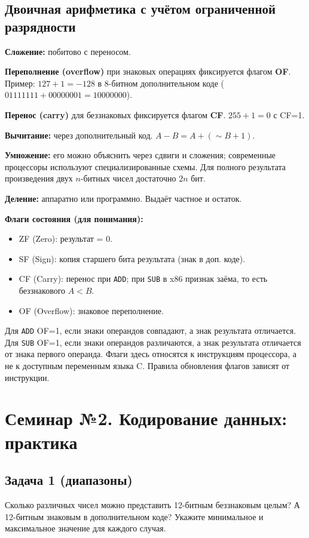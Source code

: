 \subsection{Двоичная арифметика с учётом ограниченной разрядности}

\textbf{Сложение:} побитово с переносом.

\textbf{Переполнение (overflow)} при знаковых операциях фиксируется флагом \textbf{OF}. Пример: $127 + 1 = -128$ в 8-битном дополнительном коде ($01111111 + 00000001 = 10000000$).

\textbf{Перенос (carry)} для беззнаковых фиксируется флагом \textbf{CF}. $255+1=0$ с CF=1.

\textbf{Вычитание:} через дополнительный код. $A - B = A + (\sim B + 1)$.

\textbf{Умножение:} его можно объяснить через сдвиги и сложения;
современные процессоры используют специализированные схемы.
Для полного результата произведения двух $n$-битных чисел достаточно $2n$ бит.

\textbf{Деление:} аппаратно или программно. Выдаёт частное и остаток.

\textbf{Флаги состояния (для понимания):}
\begin{itemize}
    \item ZF (Zero): результат = 0.
    \item SF (Sign): копия старшего бита результата (знак в доп. коде).
    \item CF (Carry): перенос при \texttt{ADD}; при \texttt{SUB} в x86
    признак заёма, то есть беззнакового $A<B$.
    \item OF (Overflow): знаковое переполнение.
\end{itemize}

Для \texttt{ADD} OF=1, если знаки операндов совпадают, а знак результата
отличается. Для \texttt{SUB} OF=1, если знаки операндов различаются,
а знак результата отличается от знака первого операнда.
Флаги здесь относятся к инструкциям процессора, а не к доступным
переменным языка C. Правила обновления флагов зависят от инструкции.



\newpage
\section{Семинар №2. Кодирование данных: практика}


\subsection*{Задача 1 (диапазоны)}
Сколько различных чисел можно представить 12-битным беззнаковым целым? А 12-битным знаковым в дополнительном коде? Укажите минимальное и максимальное значение для каждого случая.

